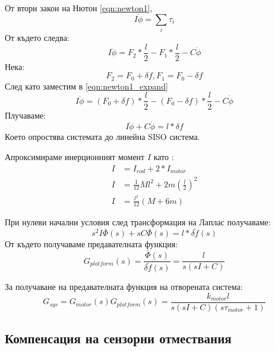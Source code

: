 От втори закон на Нютон \autoref{eqn:newton1}, 
\begin{equation}
    I \ddot{\phi} = \sum_i \tau_i
    \label{eqn:newton1}
\end{equation}
От където следва:
\begin{equation}
    I \ddot{\phi} = F_2*\frac{l}{2} - F_1*\frac{l}{2} - C \dot{\phi}
    \label{eqn:newton1_expand}
\end{equation}
Нека:
\begin{equation}
    F_2 = F_0 + \delta f, F_1 = F_0 - \delta f 
\end{equation}
След като заместим в \autoref{eqn:newton1_expand}
\begin{equation}
    I \ddot{\phi} = (F_0 + \delta f)*\frac{l}{2} - (F_0 - \delta f)*\frac{l}{2} - C \dot{\phi}
\end{equation}
Плучаваме:
\begin{equation}
    I \ddot{\phi} + C \dot{\phi} = l * \delta f
\end{equation}
Което опростява системата до линейна SISO система.

Апроксимираме инерционният момент \(I\) като :
\begin{align}
    I &= I_{rod} + 2*I_{motor}\\
    I &= \frac{1}{12}Ml^2 + 2m(\frac{l}{2})^2 \\
    I &= \frac{l^2}{12}(M + 6m)
\end{align}

При нулеви начални условия след трансформация на Лаплас получаваме:
\begin{equation}
    s^2 I \bar{\Phi}(s) + s C \bar{\Phi}(s) = l * \bar{\delta f}(s) 
\end{equation}
От където получаваме предавателната функция:
\begin{equation}
    G_{platform}(s) = \frac{\bar{\Phi}(s)}{\bar{\delta f }(s)} = \frac{l}{s ( s I + C)}
\end{equation}

За получаване на предавателната функция на отворената система:
\begin{equation}
    G_{sys} = G_{motor}(s)G_{platform}(s) = 
    \frac{k_{motor} l}{s( s I + C)(s \tau_{motor} + 1)} 
\end{equation}

\subsection{Компенсация на сензорни отмествания}

